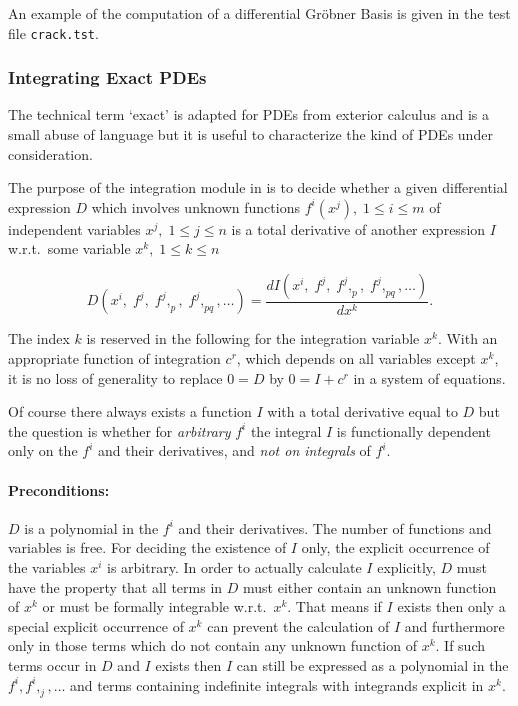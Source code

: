 An example of the computation of a differential Gr\"{o}bner Basis is
given in the test file \texttt{crack.tst}.

\subsubsection{Integrating Exact PDEs}

The technical term `exact' is adapted for PDEs from exterior calculus
and is a small abuse of language but it is useful to characterize the
kind of PDEs under consideration.

The purpose of the integration module in  is to decide
whether a given differential expression $D$ which involves unknown
functions $f^i(x^j),\; 1\leq i\leq m$ of independent variables $x^j,\;
1\leq j\leq n$ is a total derivative of another expression $I$
w.r.t.\ some variable $x^k,\; 1\leq k\leq n$

\[ D(x^i,\; f^j,\; f^j,_p,\; f^j,_{pq}, \ldots)
     = \frac{d I(x^i,\; f^j,\; f^j,_p,\; f^j,_{pq}, \ldots)}{d x^k}. \]

The index $k$ is reserved in the following for the integration
variable $x^k$.  With an appropriate function of integration $c^r$,
which depends on all variables except $x^k$, it is no loss of
generality to replace $0 = D$ by $0 = I + c^r$ in a system of
equations.

Of course there always exists a function $I$ with a total derivative
equal to $D$ but the question is whether for \emph{arbitrary} $f^i$
the integral $I$ is functionally dependent only on the $f^i$ and their
derivatives, and \emph{not on integrals} of $f^i$.

\paragraph*{Preconditions:}

$D$ is a polynomial in the $f^i$ and their derivatives.  The number of
functions and variables is free.  For deciding the existence of $I$
only, the explicit occurrence of the variables $x^i$ is arbitrary.  In
order to actually calculate $I$ explicitly, $D$ must have the property
that all terms in $D$ must either contain an unknown function of $x^k$
or must be formally integrable w.r.t.\ $x^k.$ That means if $I$ exists
then only a special explicit occurrence of $x^k$ can prevent the
calculation of $I$ and furthermore only in those terms which do not
contain any unknown function of $x^k$.  If such terms occur in $D$ and
$I$ exists then $I$ can still be expressed as a polynomial in the
$f^i, f^i,_j, \ldots$ and terms containing indefinite integrals with
integrands explicit in $x^k$.

